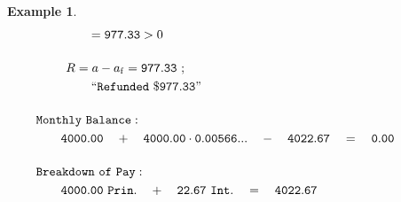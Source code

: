 \documentclass[12pt,letterpaper,oneside]{article}
\newtheorem{example}{Example}[section]
\theoremstyle{remark} %
\begin{document}
\begin{example}
\begin{align*}
	&\quad =\mathtt{977.33}>0\\[12pt]
	R&=a-a_{\rm{f}}=\mathtt{977.33}\ ;\\
	&\quad\;\mathtt{``Refunded\ \$977.33"}\\[12pt] %
	&\!\!\!\!\!\!\!\!\!\!\!\!\!\!\!\!\!\!\!\mathtt{Monthly\ Balance:}\\
	&\!\!\!\!\!\!\!\mathtt{4000.00}\quad +\quad\mathtt{4000.00}\cdot \mathtt{\rate}\quad -\quad \mathtt{4022.67}\quad =\quad \mathtt{0.00}\\[12pt]
	&\!\!\!\!\!\!\!\!\!\!\!\!\!\!\!\!\!\!\!\mathtt{Breakdown\ of\ Pay:}\\
	&\!\!\!\!\!\!\!\mathtt{4000.00\ Prin.}\quad +\quad\mathtt{22.67\ Int.}\quad =\quad\mathtt{4022.67}
	\end{align*}
	\end{example}

	\normalsize
	\newpage
\end{document}
